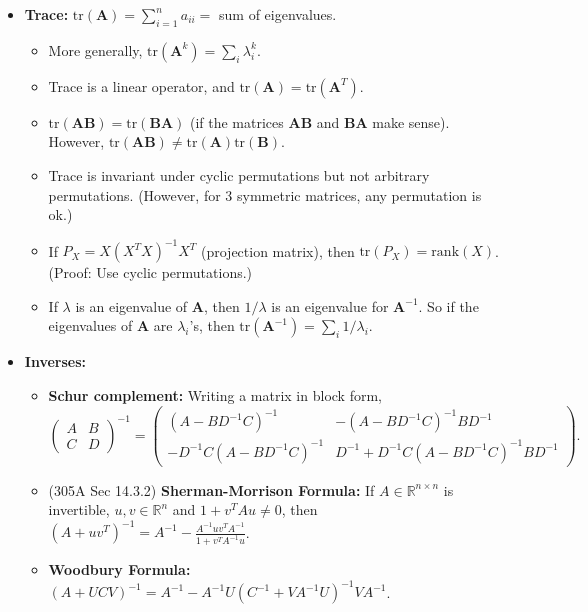 \documentclass[twoside]{article}
\newcommand{\dis}{\displaystyle}
\newcommand\bbR{\mathbb{R}}
\newcommand\lmb{\lambda}
\begin{document}
\begin{itemize}
\item \textbf{Trace:} $\text{tr}(\mathbf{A}) = \displaystyle\sum_{i=1}^n a_{ii} = $ sum of eigenvalues.
\begin{itemize}
\item More generally, $\text{tr}(\mathbf{A}^k) = \sum_i \lmb_i^k$.
\item Trace is a linear operator, and $\text{tr}(\mathbf{A}) = \text{tr}(\mathbf{A}^T)$.
\item $\text{tr}(\mathbf{AB}) = \text{tr}(\mathbf{BA})$ (if the matrices $\mathbf{AB}$ and $\mathbf{BA}$ make sense). However, $\text{tr}(\mathbf{AB}) \neq \text{tr}(\mathbf{A})\text{tr}(\mathbf{B})$.
\item Trace is invariant under cyclic permutations but not arbitrary permutations. (However, for 3 symmetric matrices, any permutation is ok.)
\item If $P_X = X(X^T X)^{-1}X^T$ (projection matrix), then $\text{tr} (P_X) = \text{rank}(X)$. (Proof: Use cyclic permutations.)
\item If $\lmb$ is an eigenvalue of $\mathbf{A}$, then $1/\lmb$ is an eigenvalue for $\mathbf{A}^{-1}$. So if the eigenvalues of $\mathbf{A}$ are $\lmb_i$'s, then $\text{tr}(\mathbf{A}^{-1}) = \sum_i 1/\lmb_i$.
\end{itemize}

\item \textbf{Inverses:}
\begin{itemize}
\item \textbf{Schur complement:} Writing a matrix in block form,
\[ \begin{pmatrix} A & B \\ C & D \end{pmatrix}^{-1} = \begin{pmatrix} (A - BD^{-1}C)^{-1} & -(A - BD^{-1}C)^{-1}BD^{-1} \\ -D^{-1}C(A - BD^{-1}C)^{-1} & D^{-1} + D^{-1}C(A - BD^{-1}C)^{-1}BD^{-1} \end{pmatrix}. \]

\item (305A Sec 14.3.2) \textbf{Sherman-Morrison Formula:} If $A \in \bbR^{n \times n}$ is invertible, $u, v \in \bbR^n$ and $1 + v^T A u \neq 0$, then $(A + uv^T)^{-1} = A^{-1} - \dis\frac{A^{-1}uv^T A^{-1}}{1 + v^T A^{-1}u}$.

\item \textbf{Woodbury Formula:} $(A+UCV)^{-1} = A^{-1} - A^{-1}U(C^{-1} + VA^{-1}U)^{-1} VA^{-1}$.
\end{itemize}


\end{itemize}
\end{document}

